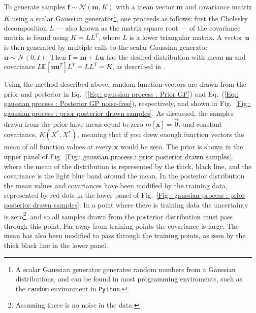 \documentclass[twoside,english]{uiofysmaster}
\begin{document}
{{To generate samples $\textbf{f} \sim \mathcal{N}(\textbf{m}, K)$ with a mean vector $\textbf{m}$ and covariance matrix $K$ using a scalar Gaussian generator\footnote{A scalar Gaussian generator generates random numbers from a Gaussian distributions, and can be found in most programming enviroments, such as the \verb|random| environment in \verb|Python|.}, one proceeds as follows: first the Cholesky decomposition $L$ --- also known as the matrix square root ---  of the covariance matrix is found using $K = LL^T$, where $L$ is a lower triangular matrix. A vector $\textbf{u}$ is then generated by multiple calls to the scalar Gaussian generator $\textbf{u} \sim \mathcal{N}(0, I)$. Then $\textbf{f} = \textbf{m} + L \textbf{u}$ has the desired distribution with mean $\textbf{m}$ and covariance $L \mathbb{E} [\textbf{u} \textbf{u}^T]L^T = LL^T = K$, as described in \cite{rasmussen2006gaussian}.

Using the method described above, random function vectors are drawn from the prior and posterior in Eq.~(\ref{Eq:: gaussian process : Prior GP}) and Eq.~(\ref{Eq:: gaussian process : Posterior GP noise-free}), respectively, and shown in Fig.~\ref{Fig:: gaussian process : prior posterior drawn samples}. As discussed, the samples drawn from the prior have mean equal to zero $m[\textbf{x}]=\vec{0}$, and constant covariance, $K(X^*, X^*)$, meaning that if you drew enough function vectors the mean of all function values at every $\textbf{x}$ would be zero. The prior is shown in the upper panel of Fig.~\ref{Fig:: gaussian process : prior posterior drawn samples}, where the mean of the distribution is represented by the thick, black line, and the covariance is the light blue band around the mean. In the posterior distribution the mean values and covariances have been modified by the training data, represented by red dots in the lower panel of Fig.~\ref{Fig:: gaussian process : prior posterior drawn samples}. In a point where there is training data the uncertainty is zero\footnote{Assuming there is no noise in the data.}, and so all samples drawn from the posterior distribution must pass through this point. Far away from training points the covariance is large. The mean has also been modified to pass through the training points, as seen by the thick black line in the lower panel.

}}
\end{document}
